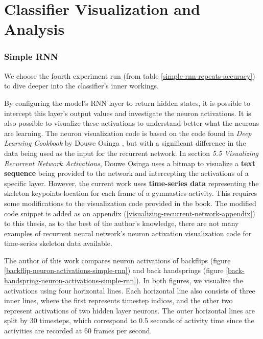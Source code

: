 \section{Classifier Visualization and\\ Analysis}
\label{classifier-visualization}

\subsubsection{Simple RNN} 

We choose the fourth experiment run (from table \ref{simple-rnn-repeats-accuracy}) to dive deeper into the classifier's inner workings.

By configuring the model's RNN layer to return hidden states, it is possible to intercept this layer's output values and investigate the neuron activations. It is also possible to visualize these activations to understand better what the neurons are learning. The neuron visualization code is based on the code found in \textit{Deep Learning Cookbook} by Douwe Osinga \cite{deep-learning-cookbook}, but with a significant difference in the data being used as the input for the recurrent network. In section \textit{5.5 Visualizing Recurrent Network Activations}, Douwe Osinga uses a bitmap to visualize a \textbf{text sequence} being provided to the network and intercepting the activations of a specific layer. However, the current work uses \textbf{time-series data} representing the skeleton keypoints location for each frame of a gymnastics activity. This requires some modifications to the visualization code provided in the book. The modified code snippet is added as an appendix (\ref{visualizing-recurrent-network-appendix}) to this thesis, as to the best of the author's knowledge, there are not many examples of recurrent neural network's neuron activation visualization code for time-series skeleton data available.

The author of this work compares neuron activations of backflips (figure \ref{backflip-neuron-activations-simple-rnn}) and back handsprings (figure \ref{back-handspring-neuron-activations-simple-rnn}). In both figures, we visualize the activations using four horizontal lines. Each horizontal line also consists of three inner lines, where the first represents timestep indices, and the other two represent activations of two hidden layer neurons. The outer horizontal lines are split by 30 timesteps, which correspond to 0.5 seconds of activity time since the activities are recorded at 60 frames per second.

